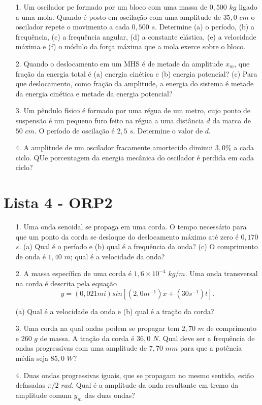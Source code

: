 \begin{itemize}
\item[1.] \textbf{\cite{Halliday2009vol2}}Um oscilador pe formado por um bloco com uma massa de $0,500$ $kg$ ligado a uma mola. Quando é posto em oscilação com uma amplitude de $35,0$ $cm$ o oscilador repete o movimento a cada $0,500$ $s$. Determine (a) o período, (b) a frequência, (c) a frequência angular, (d) a constante elástica, (e) a velocidade máxima e (f) o módulo da força máxima que a mola exerce sobre o bloco.
\item[2.] \textbf{\cite{Halliday2009vol2}}Quando o deslocamento em um MHS é de metade da amplitude $x_m$, que fração da energia total é (a) energia cinética e (b) energia potencial? (c) Para que deslocamento, como fração da amplitude, a energia do sistema é metade da energia cinética e metade da energia potencial?
\item[3.] \textbf{\cite{Halliday2009vol2}}Um pêndulo físico é formado por uma régua de um metro, cujo ponto de suspensão é um pequeno furo feito na régua a uma distância $d$ da marca de $50$ $cm$. O período de oscilação é $2,5$ $s$. Determine o valor de $d$.
\item[4.] \textbf{\cite{Halliday2009vol2}}A amplitude de um oscilador fracamente amortecido diminui $3,0\%$ a cada ciclo. QUe porcentagem da energia mecânica do oscilador é perdida em cada ciclo?
\end{itemize}
\newpage
\section{Lista 4 - ORP2} \label{ch:orp2l4}

\begin{itemize}
\item[1.] \textbf{\cite{Halliday2009vol2}} Uma onda senoidal se propaga em uma corda. O tempo necessário para que um ponto da corda se desloque do deslocamento máximo até zero é $0,170$ $s$. (a) Qual é o período e (b) qual é a frequência da onda? (c) O comprimento de onda é $1,40$ $m$; qual é a velocidade da onda?

\item[2.] \textbf{\cite{Halliday2009vol2}} A massa específica de uma corda é $1,6 \times 10^{-4}$ $kg/m$. Uma onda transversal na corda é descrita pela equação
\begin{equation*}
y = (0,021mi)sin[(2,0 m^{-1})x + (30s^{-1})t].
\end{equation*}

(a) Qual é a velocidade da onda e (b) qual é a tração da corda?

\item[3.] \textbf{\cite{Halliday2009vol2}} Uma corda na qual ondas podem se propagar tem $2,70$ $m$ de comprimento e $260$ $g$ de massa. A tração da corda é $36,0$ $N$. Qual deve ser a frequência de ondas progressivas com uma amplitude de $7,70$ $mm$ para que a potência média seja $85,0$ $W$?

\item[4.] \textbf{\cite{Halliday2009vol2}} Duas ondas progressivas iguais, que se propagam no mesmo sentido, estão defasadas $\pi /2$  $rad$. Qual é a amplitude da onda resultante em tremo da amplitude comum $y_m$ das duas ondas?
\end{itemize}
\newpage
